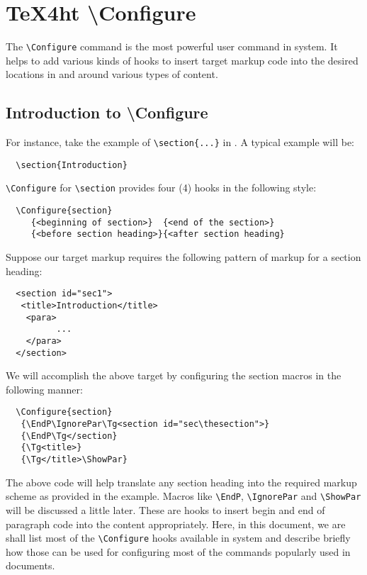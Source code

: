 
\chapter{\TeX4ht \textbackslash{}Configure}

The \Verb=\Configure= command is the most powerful user command in
\texht system.  It helps to add various kinds of hooks to insert
target markup code into the desired locations in and around various
types of content.

\section{Introduction to \textbackslash{}Configure}

For instance, take the example of
\Verb=\section{...}= in \latex. A typical example will be:
\begin{verbatim}
  \section{Introduction}
\end{verbatim}
\Verb=\Configure= for \Verb=\section= provides four (4) hooks in the
following style:
\begin{verbatim}
  \Configure{section}
     {<beginning of section>}  {<end of the section>}
     {<before section heading>}{<after section heading}
\end{verbatim}
Suppose our target markup requires the following pattern of markup for
a section heading:
\begin{verbatim}
  <section id="sec1">
   <title>Introduction</title>
    <para>
          ...
    </para>
  </section>
\end{verbatim}
We will accomplish the above target by configuring the section macros
in the following manner:
\begin{verbatim}
  \Configure{section}
   {\EndP\IgnorePar\Tg<section id="sec\thesection">}
   {\EndP\Tg</section}
   {\Tg<title>}
   {\Tg</title>\ShowPar}
\end{verbatim}
The above code will help translate any \latex section heading into the
required markup scheme as provided in the example.  Macros like
\Verb=\EndP=, \Verb=\IgnorePar= and \Verb=\ShowPar= will be discussed
a little later. These are hooks to insert begin and end of paragraph
code into the content appropriately.  Here, in this document, we are
shall list most of the \Verb=\Configure= hooks available in \texht
system and describe briefly how those can be used for configuring most
of the \latex commands popularly used in documents.

